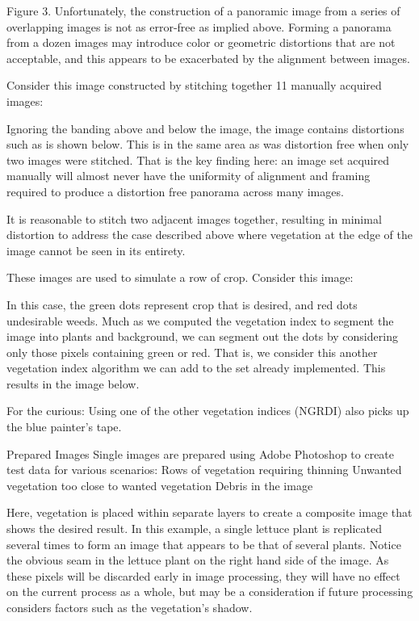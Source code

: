 \documentclass[letterpaper]{article}
\begin{document}
Figure 3. 
Unfortunately, the construction of a panoramic image from a series of  overlapping images is not as error-free as implied above. Forming a panorama from a dozen images may introduce color or geometric distortions that are not acceptable, and this appears to be exacerbated by the alignment between images.

Consider this image constructed by stitching together 11 manually acquired images:


Ignoring the banding above and below the image, the image contains distortions such as is shown below. This is in the same area as was distortion free when only two images were stitched. That is the key finding here: an image set acquired manually will almost never have the uniformity of alignment and framing required to produce a distortion free panorama across many images.



It is reasonable to stitch two adjacent images together, resulting in minimal distortion to address the case described above where vegetation at the edge of the image cannot be seen in its entirety.

These images are used to simulate a row of crop. Consider this image:

In this case, the green dots represent crop that is desired, and red dots undesirable weeds.
Much as we computed the vegetation index to segment the image into plants and background, we can segment out the dots by considering only those pixels containing green or red.  That is, we consider this another vegetation index algorithm we can add to the set already implemented. This results in the image below.




For the curious:  Using one of the other vegetation indices  (NGRDI) also picks up the blue painter’s tape.


Prepared Images
Single images are prepared using Adobe Photoshop to create test data for various scenarios:
Rows of vegetation requiring thinning
Unwanted vegetation too close to wanted vegetation
Debris in the image

Here, vegetation is placed within separate layers to create a composite image that shows the desired result. In this example, a single lettuce plant is replicated several times to form an image that appears to be that of several plants. Notice the obvious seam in the lettuce plant on the  right hand side of the image. As these pixels will be discarded early in image processing, they will have no effect on the current process as a whole, but may be a consideration if future processing considers factors such as the vegetation’s shadow.
\end{document}
